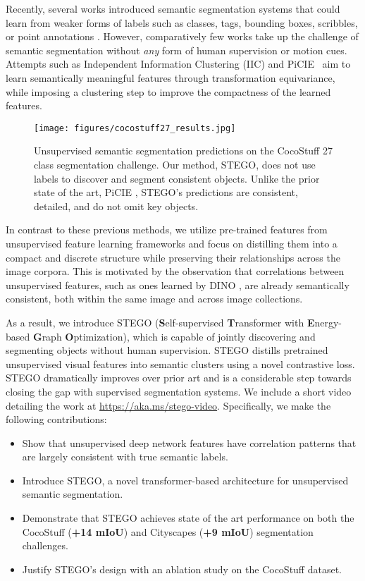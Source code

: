 \documentclass{article} \usepackage{iclr2022_conference,times}
\begin{document}
Recently, several works introduced semantic segmentation systems that could learn from weaker forms of labels such as classes, tags, bounding boxes, scribbles, or point annotations \citep{ren2020ufo,pan2021weakly,liu2020leveraging,bilen_benenson}. However, comparatively few works take up the challenge of semantic segmentation without \textit{any} form of human supervision or motion cues. Attempts such as Independent Information Clustering (IIC) \citep{iic} and PiCIE~\citep{Cho2021PiCIEUS} aim to learn semantically meaningful features through transformation equivariance, while imposing a clustering step to improve the compactness of the learned features.


\begin{figure}[h]
 \centering
 \texttt{[image: figures/cocostuff27\_results.jpg]}
  \vspace{-.3in}
  \caption{Unsupervised semantic segmentation predictions on the CocoStuff \citep{cocostuff} 27 class segmentation challenge. Our method, STEGO, does not use labels to discover and segment consistent objects. Unlike the prior state of the art, PiCIE \citep{Cho2021PiCIEUS}, STEGO's predictions are consistent, detailed, and do not omit key objects.}
\label{fig:teaser}
\end{figure} 
In contrast to these previous methods, we utilize pre-trained features from unsupervised feature learning frameworks and focus on distilling them into a compact and discrete structure while preserving their relationships across the image corpora. This is motivated by the observation that correlations between unsupervised features, such as ones learned by DINO \citep{dino}, are already semantically consistent, both within the same image and across image collections. 


As a result, we introduce STEGO (\textbf{S}elf-supervised \textbf{T}ransformer with \textbf{E}nergy-based \textbf{G}raph \textbf{O}ptimization), which is capable of jointly discovering and segmenting objects without human supervision. STEGO distills pretrained unsupervised visual features into semantic clusters using a novel contrastive loss. STEGO dramatically improves over prior art and is a considerable step towards closing the gap with supervised segmentation systems. We include a short video detailing the work at {\color{blue}\url{https://aka.ms/stego-video}}. Specifically, we make the following contributions:
\vspace{-.1in}
\begin{itemize}
\setlength{\itemsep}{0pt}
\item Show that unsupervised deep network features have correlation patterns that are largely consistent with true semantic labels.
\item Introduce STEGO, a novel transformer-based architecture for unsupervised semantic segmentation.
\item Demonstrate that STEGO achieves state of the art performance on both the CocoStuff (\textbf{+14 mIoU}) and Cityscapes (\textbf{+9 mIoU}) segmentation challenges.
\item Justify STEGO's design with an ablation study on the CocoStuff dataset.
\end{itemize}
\end{document}
